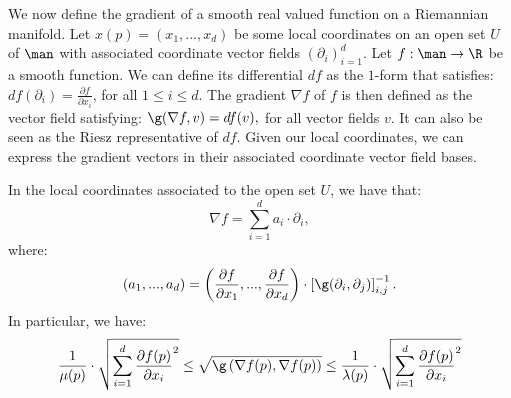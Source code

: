 We now define the gradient of a smooth real valued function on a Riemannian manifold. 
Let $x(p)=(x_1,...,x_d)$ be some local coordinates on an open set $U$ of $\man$
with associated coordinate vector fields $(\partial_i)_{i=1}^d$.
Let $f:\man\rightarrow\R$ be a smooth function. We can define its differential $df$ as the $1$-form that satisfies:
$df(\partial_i)=\frac{\partial f}{\partial x_i}$, 
for all $1\leq i \leq d.$
The gradient $\nabla f$ of $f$ is then defined as the vector field satisfying:
$\g(\nabla f,v)=df(v),$
for all vector fields $v$. It can also be seen as the Riesz representative of $df$.
Given our local coordinates, we can express the gradient vectors in their associated coordinate vector field bases.
\begin{proposition}\label{prop:grad}
In the local coordinates associated to the open set $U$, we have that:
$$\nabla f=\sum_{i=1}^d a_i\cdot\partial_i,$$
where:
$$(a_1,...,a_d)=\left(\frac{\partial f}{\partial x_1},...,\frac{\partial f}{\partial x_d}\right)\cdot\left[\g(\partial_i,\partial_j)\right]_{i,j}^{-1}.$$
In particular, we have:
$$\frac{1}{\mu(p)}\cdot \sqrt{\sum_{i=1}^d\frac{\partial f(p)}{\partial x_i}^2}\leq \sqrt{\g\left(\nabla f(p),\nabla f(p)\right)}\leq \frac{1}{\lambda(p)}\cdot \sqrt{\sum_{i=1}^d\frac{\partial f(p)}{\partial x_i}^2}$$

\end{proposition}












